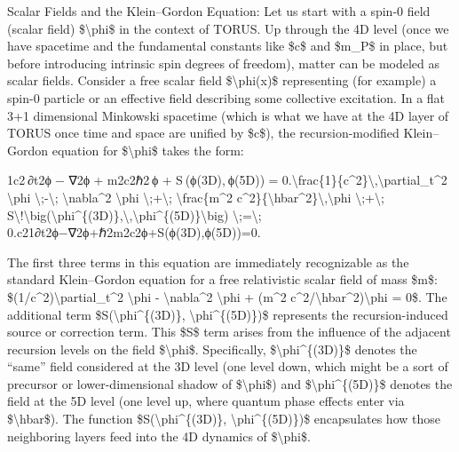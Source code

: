 \documentclass[
]{article}
\begin{document}
Scalar Fields and the Klein--Gordon Equation: Let us start with a spin-0
field (scalar field) \$\textbackslash phi\$ in the context of TORUS. Up
through the 4D level (once we have spacetime and the fundamental
constants like \$c\$ and \$m\_P\$ in place, but before introducing
intrinsic spin degrees of freedom), matter can be modeled as scalar
fields. Consider a free scalar field \$\textbackslash phi(x)\$
representing (for example) a spin-0 particle or an effective field
describing some collective excitation. In a flat 3+1 dimensional
Minkowski spacetime (which is what we have at the 4D layer of TORUS once
time and space are unified by \$c\$), the recursion-modified
Klein--Gordon equation for \$\textbackslash phi\$ takes the form:

1c2 ∂t2ϕ  −  ∇2ϕ  +  m2c2ℏ2 ϕ  +  S ⁣(ϕ(3D), ϕ(5D))  =  0.\textbackslash frac\{1\}\{c\^{}2\}\textbackslash,\textbackslash partial\_t\^{}2
\textbackslash phi \textbackslash;-\textbackslash;
\textbackslash nabla\^{}2 \textbackslash phi
\textbackslash;+\textbackslash; \textbackslash frac\{m\^{}2
c\^{}2\}\{\textbackslash hbar\^{}2\}\textbackslash,\textbackslash phi
\textbackslash;+\textbackslash;
S\textbackslash!\textbackslash big(\textbackslash phi\^{}\{(3D)\},\textbackslash,\textbackslash phi\^{}\{(5D)\}\textbackslash big)
\textbackslash;=\textbackslash;
0.c21\hspace{0pt}∂t2\hspace{0pt}ϕ−∇2ϕ+ℏ2m2c2\hspace{0pt}ϕ+S(ϕ(3D),ϕ(5D))=0.

The first three terms in this equation are immediately recognizable as
the standard Klein--Gordon equation for a free relativistic scalar field
of mass \$m\$: \$(1/c\^{}2)\textbackslash partial\_t\^{}2
\textbackslash phi - \textbackslash nabla\^{}2 \textbackslash phi +
(m\^{}2 c\^{}2/\textbackslash hbar\^{}2)\textbackslash phi = 0\$. The
additional term \$S(\textbackslash phi\^{}\{(3D)\},
\textbackslash phi\^{}\{(5D)\})\$ represents the recursion-induced
source or correction term. This \$S\$ term arises from the influence of
the adjacent recursion levels on the field \$\textbackslash phi\$.
Specifically, \$\textbackslash phi\^{}\{(3D)\}\$ denotes the ``same''
field considered at the 3D level (one level down, which might be a sort
of precursor or lower-dimensional shadow of \$\textbackslash phi\$) and
\$\textbackslash phi\^{}\{(5D)\}\$ denotes the field at the 5D level
(one level up, where quantum phase effects enter via
\$\textbackslash hbar\$). The function
\$S(\textbackslash phi\^{}\{(3D)\}, \textbackslash phi\^{}\{(5D)\})\$
encapsulates how those neighboring layers feed into the 4D dynamics of
\$\textbackslash phi\$.
\end{document}
